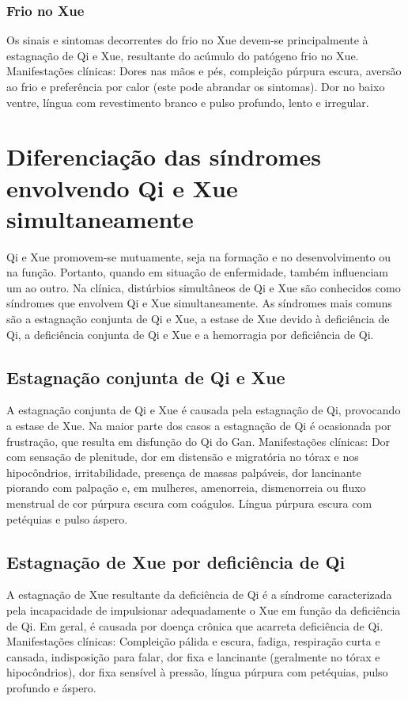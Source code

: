 \documentclass[12pt,oneside,a4paper]{book} %
\begin{document}
\subsection{Frio no Xue}
Os sinais e sintomas decorrentes do frio no Xue devem-se principalmente à estagnação de Qi e Xue, resultante do acúmulo do patógeno frio no Xue. 
Manifestações clínicas: Dores nas mãos e pés, compleição púrpura escura, aversão ao frio e preferência por calor (este pode abrandar os sintomas). Dor no baixo ventre, língua com revestimento branco e pulso profundo, lento e irregular.


\chapter{Diferenciação das síndromes envolvendo Qi e Xue simultaneamente}

Qi e Xue promovem-se mutuamente, seja na formação e no desenvolvimento ou na função. Portanto, quando em situação de enfermidade, também influenciam um ao outro. Na clínica, distúrbios simultâneos de Qi e Xue são conhecidos como síndromes que envolvem Qi e Xue simultaneamente. As síndromes mais comuns são a estagnação conjunta de Qi e Xue, a estase de Xue devido à deficiência de Qi, a deficiência conjunta de Qi e Xue e a hemorragia por deficiência de Qi.

\section{Estagnação conjunta de Qi e Xue}
A estagnação conjunta de Qi e Xue é causada pela estagnação de Qi, provocando a estase de Xue. Na maior parte dos casos a estagnação de Qi é ocasionada por frustração, que resulta em disfunção do Qi do Gan.
Manifestações clínicas: Dor com sensação de plenitude, dor em distensão e migratória no tórax e nos hipocôndrios, irritabilidade, presença de massas palpáveis, dor lancinante piorando com palpação e, em mulheres, amenorreia, dismenorreia ou fluxo menstrual de cor púrpura escura com coágulos. Língua púrpura escura com petéquias e pulso áspero.

\section{Estagnação de Xue por deficiência de Qi}
A estagnação de Xue resultante da deficiência de Qi é a síndrome caracterizada pela incapacidade de impulsionar adequadamente o Xue em função da deficiência de Qi. Em geral, é causada por doença crônica que acarreta deficiência de Qi. 
Manifestações clínicas: Compleição pálida e escura, fadiga, respiração curta e cansada, indisposição para falar, dor fixa e lancinante (geralmente no tórax e hipocôndrios), dor fixa sensível à pressão, língua púrpura com petéquias, pulso profundo e áspero.
\end{document}
